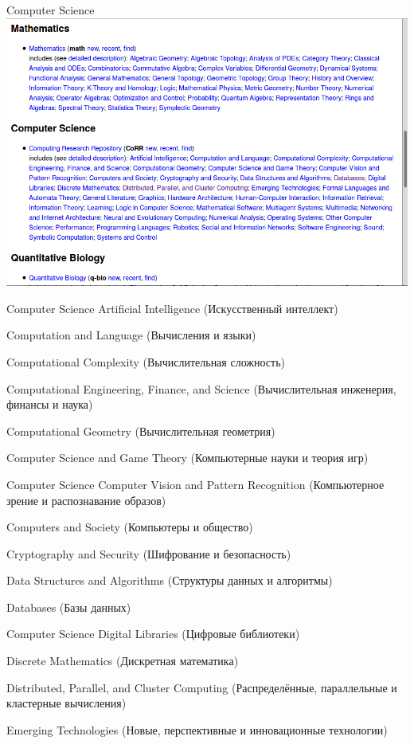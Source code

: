 \documentclass[14pt]{beamer}
\begin{document}
\begin{frame}{Computer Science}
\includegraphics[width=\linewidth]{computer_science}
\end{frame}

\begin{frame}{Computer Science}
Artificial Intelligence (Искусственный интеллект)

Computation and Language (Вычисления и языки)

Computational Complexity (Вычислительная сложность)

Computational Engineering, Finance, and Science (Вычислительная инженерия, финансы и наука)

Computational Geometry (Вычислительная геометрия)

Computer Science and Game Theory (Компьютерные науки и теория игр)
\end{frame}

\begin{frame}{Computer Science}
Computer Vision and Pattern Recognition (Компьютерное зрение и распознавание образов)

Computers and Society (Компьютеры и общество)

Cryptography and Security (Шифрование и безопасность)

Data Structures and Algorithms (Структуры данных и алгоритмы)

Databases (Базы данных)
\end{frame}

\begin{frame}{Computer Science}
Digital Libraries (Цифровые библиотеки)

Discrete Mathematics (Дискретная математика)

Distributed, Parallel, and Cluster Computing (Распределённые, параллельные и кластерные вычисления)

Emerging Technologies (Новые, перспективные и инновационные технологии)
\end{frame}
\end{document}
